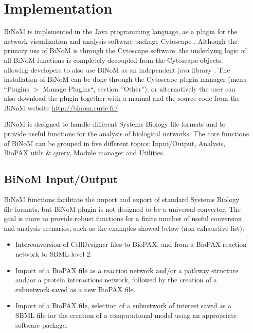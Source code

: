 \documentclass[10pt]{bmc_article}
\newenvironment{bmcformat}{\baselineskip20pt\sloppy\setboolean{publ}{false}}{\baselineskip20pt\sloppy}
\begin{document}
\begin{bmcformat}
\section*{Implementation}
BiNoM is implemented in the Java programming language, as a plugin
for the network visualization and analysis software package Cytoscape
\cite{cline2007integration}. Although the primary use of BiNoM is through the
Cytoscape software, the underlying logic of all BiNoM functions is completely
decoupled from the Cytoscape objects, allowing developers to also use BiNoM as
an independent java library \cite{zinovyev2008binom}. The installation of BiNoM
can be done through the Cytoscape plugin manager (menu ``Plugins $>$ Manage
Plugins``, section ''Other''), or alternatively the user can
also download the plugin together with a manual and the source code from the
BiNoM website
\url{http://binom.curie.fr/}. 


BiNoM is designed to handle different Systems Biology file formats and to
provide useful functions for the analysis of biological networks. The core
functions of BiNoM can be grouped in five different topics: Input/Output,
Analysis, BioPAX utils \& query, Module manager and Utilities.

\subsection*{BiNoM Input/Output}

BiNoM functions facilitate the import and export of standard Systems Biology
file formats, but BiNoM plugin is not designed to be a universal converter.
The goal is more
to provide robust functions for a finite number of useful conversion and
analysis scenarios, such as the examples showed below (non-exhaustive list):

\begin{itemize}

\item Interconversion of CellDesigner files to BioPAX, and from a BioPAX
reaction network to SBML level 2.

\item Import of a BioPAX file as a reaction network and/or a pathway structure
and/or a protein interactions network, followed by the creation of a subnetwork
saved as a new BioPAX file.

\item Import of a BioPAX file, selection of a subnetwork of interest saved as a SBML file for
the creation of a computational model using an appropriate software package.


\end{itemize}
\end{bmcformat}
\end{document}
